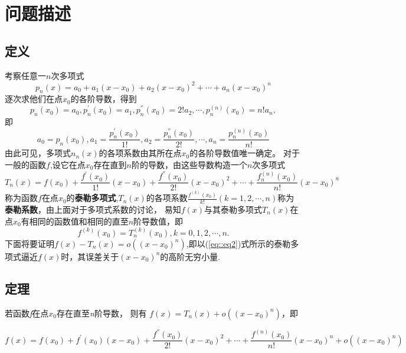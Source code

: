 \section{问题描述}
\subsection{定义}
考察任意一$n$次多项式
\begin{equation}
    p_n(x)=a_0+a_1(x-x_0)+a_2(x-x_0)^2+\cdots+a_n(x-x_0)^n
    \label{eq::eq2}
\end{equation}
逐次求他们在点$x_0$的各阶导数，得到
$$ p_n(x_0)=a_0,p^{'}_n(x_0)=a_1,p^{''}_n(x_0)=2! a_2,\cdots,p^{(n)}_n(x_0)=n!a_n,$$
即
$$ a_0=p_n(x_0),a_1=\frac{p^{'}_n(x_0)}{1!},a_2=\frac{p^{''}_n(x_0)}{2!},\cdots,a_n=\frac{p^{(n)}_n(x_0)}{n!}$$
由此可见，多项式$n_n(x)$的各项系数由其所在点$x_0$的各阶导数值唯一确定。
对于一般的函数$f$,设它在点$x_0$存在直到$n$阶的导数，由这些导数构造一个$n$次多项式
\begin{equation}
    T_n(x)=f(x_0)+\frac{f^{'}(x_0)}{1!}(x-x_0)+\frac{f^{''}(x_0)}{2!}(x-x_0)^2+\cdots+\frac{f^{(n)}_n(x_0)}{n!}(x-x_0)^n
    \label{eq::eq3}
\end{equation}
称为函数$f$在点$x_0$的\textbf{泰勒多项式},$T_n(x)$的各项系数$\frac{f^{(k)}(x_0)}{k!}(k=1,2,\cdots,n)$称为\textbf{泰勒系数}，由上面对于多项式系数的讨论，
易知$f(x)$与其泰勒多项式$T_n(x)$在点$x_0$有相同的函数值和相同的直至$n$阶导数值，即
$$f^{(k)}(x_0)=T^{(k)}_n(x_0),k=0,1,2,\cdots,n.$$
下面将要证明$f(x)-T_n(x)=o((x-x_0)^n)$,即以(\ref{eq::eq2})式所示的泰勒多项式逼近$f(x)$时，其误差关于$(x-x_0)^n$的高阶无穷小量.

\subsection{定理}
若函数\emph{f}在点$x_0$存在直至\emph{n}阶导数，
则有 $f(x)=T_n(x)+o((x-x_0)^n)$，即

\begin{equation}
    f(x)=f(x_0)+f^{'}(x_0)(x-x_0)+\frac{f^{''}(x_0)}{2!}(x-x_0)^2+\cdots
    +\frac{f^{(n)}(x_0)}{n!}(x-x_0)^{n}+o((x-x_0)^n)
    \label{eq::eq4}
\end{equation}

